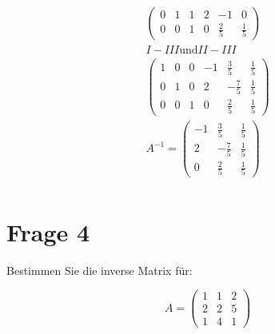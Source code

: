 \begin{align*}
\begin{pmatrix}
        0 & 1 & 1 & 2 & -1 & 0 \\
        0 & 0 & 1 & 0 & \frac{2}{5} & \frac{1}{5}
    \end{pmatrix} \\
    I - III \text{und} II - III \\
    \begin{pmatrix}
        1 & 0 & 0 & -1 & \frac{3}{5} & \frac{1}{5} \\
        0 & 1 & 0 & 2 & -\frac{7}{5} & \frac{1}{5} \\
        0 & 0 & 1 & 0 & \frac{2}{5} & \frac{1}{5}
    \end{pmatrix} \\
    A^{-1} =     \begin{pmatrix}
        -1 &\frac{3}{5} & \frac{1}{5} \\
        2 & -\frac{7}{5} & \frac{1}{5} \\
        0 & \frac{2}{5} & \frac{1}{5}
    \end{pmatrix} \\
\end{align*}

\section{Frage 4}

Bestimmen Sie die inverse Matrix für:

\[
    A = \begin{pmatrix}
        1 & 1 & 2 \\
        2 & 2 & 5 \\
        1 & 4 & 1
    \end{pmatrix}
\]

